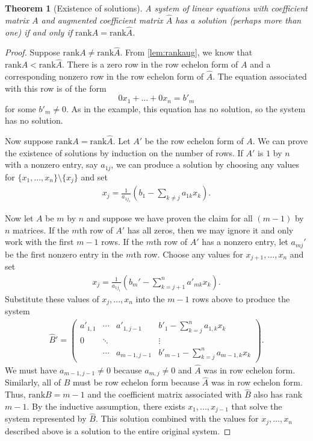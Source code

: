 \documentclass[12pt,reqno]{amsart}
\newcommand{\rank}{\mathrm{rank}}
\newtheorem{theorem}{Theorem}[section]
\theoremstyle{definition}
\begin{document}
\begin{theorem}[Existence of solutions]\label{thm:exist}
  A system of linear equations with coefficient matrix $A$ and
  augmented coefficient matrix $\hat{A}$ has a solution (perhaps more
  than one) if and only if $\rank A = \rank \hat{A}$.
\end{theorem}
\begin{proof}
  Suppose $\rank A \neq \rank \hat{A}$. From \ref{lem:rankaug}, we
  know that $\rank A < \rank \hat{A}$. There is a zero row in the row
  echelon form of $A$ and a corresponding nonzero row in the row
  echelon form of $\hat{A}$. The equation associated with this row is
  of the form
  \[ 0 x_1 + ... + 0 x_n = b'_m \]
  for some $b'_m \neq 0$. As in the example, this equation has no
  solution, so the system has no solution. 

  Now suppose $\rank A = \rank \hat{A}$. Let $A'$ be the row echelon
  form of $A$. We can prove the existence of solutions by induction on
  the number of rows. If $A'$ is $1$ by $n$ with a nonzero entry, say
  $a_{1j}$, we can produce a solution by choosing any values for
  $\{x_{1}, ... , x_{n}\} \setminus \{x_j\}$ and set
  \begin{align*}
    x_{j} = \frac{1}{a_{1j_1}} \left(b_1 - \sum_{k \neq j} a_{1k}
      x_{k} \right).
  \end{align*}
  
  Now let $A$ be $m$ by $n$ and suppose we have proven the claim for
  all $(m-1)$ by $n$ matrices. If the $m$th row of $A'$ has all zeros,
  then we may ignore it and only work with the first $m-1$ rows. If
  the $m$th row of $A'$ has a nonzero entry, let $a_{mj}'$ be the
  first nonzero entry in the $m$th row. Choose any values for
  $x_{j+1},...,x_n$ and set
  \begin{align*}
    x_{j} = \frac{1}{a_{1j_1}} \left(b_m' - \sum_{k = j+1}^n a'_{mk}
      x_{k} \right).
  \end{align*}
  Substitute these values of $x_j, ..., x_n$ into the $m-1$ rows above
  to produce the system
  \begin{align*}
    \hat{B}' = \begin{pmatrix}
      a'_{1,1} & \cdots  & a'_{1,j-1} & b'_1 - \sum_{k=j}^n a_{1,k} x_k  \\
      0 & \ddots &                & \vdots \\ 
          & \cdots  & a_{m-1,j-1} & b'_{m-1} - \sum_{k=j}^n a_{m-1,k}x_k 
    \end{pmatrix}.
  \end{align*}
  We must have $a_{m-1,j-1} \neq 0$ because $a_{m,j} \neq 0$ and
  $\hat{A}$ was in row echelon form. Similarly, all of $\hat{B}$ must
  be row echelon form because $\hat{A}$ was in row echelon form. Thus,
  $\rank B = m-1$ and the coefficient matrix associated with $\hat{B}$
  also has rank $m-1$. By the inductive assumption, there exists $x_1,
  ... , x_{j-1}$ that solve the system represented by $\hat{B}$. This
  solution combined with the values for $x_j , ..., x_n$ described
  above is a solution to the entire original system.
\end{proof}
\end{document}
